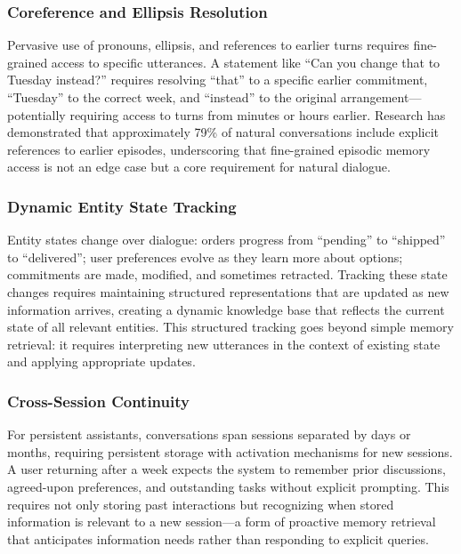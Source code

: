 \documentclass[11pt,letterpaper]{article}
\begin{document}
\subsubsection{Coreference and Ellipsis Resolution}

Pervasive use of pronouns, ellipsis, and references to earlier turns requires fine-grained access to specific utterances. A statement like ``Can you change that to Tuesday instead?'' requires resolving ``that'' to a specific earlier commitment, ``Tuesday'' to the correct week, and ``instead'' to the original arrangement---potentially requiring access to turns from minutes or hours earlier. Research has demonstrated that approximately 79\% of natural conversations include explicit references to earlier episodes, underscoring that fine-grained episodic memory access is not an edge case but a core requirement for natural dialogue.

\subsubsection{Dynamic Entity State Tracking}

Entity states change over dialogue: orders progress from ``pending'' to ``shipped'' to ``delivered''; user preferences evolve as they learn more about options; commitments are made, modified, and sometimes retracted. Tracking these state changes requires maintaining structured representations that are updated as new information arrives, creating a dynamic knowledge base that reflects the current state of all relevant entities. This structured tracking goes beyond simple memory retrieval: it requires interpreting new utterances in the context of existing state and applying appropriate updates.

\subsubsection{Cross-Session Continuity}

For persistent assistants, conversations span sessions separated by days or months, requiring persistent storage with activation mechanisms for new sessions. A user returning after a week expects the system to remember prior discussions, agreed-upon preferences, and outstanding tasks without explicit prompting. This requires not only storing past interactions but recognizing when stored information is relevant to a new session---a form of proactive memory retrieval that anticipates information needs rather than responding to explicit queries.
\end{document}
